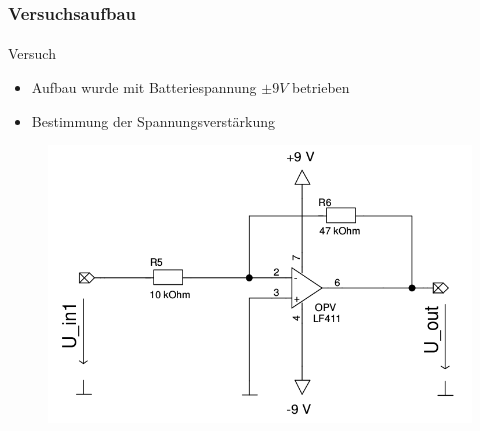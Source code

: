 \begin{frame}
\frametitle{Versuchsaufbau}
\framesubtitle{}
    \begin{block}{Versuch}
        \begin{itemize}
            \item Aufbau wurde mit Batteriespannung $\pm 9V$ betrieben
            \item Bestimmung der Spannungsverstärkung
        \end{itemize}    
    \end{block}    
    \begin{figure}[H]
    \begin{center}
            \includegraphics[scale=0.2]{./img/schaltung/inv_verst_0.png}
    \end{center}
    \end{figure}
\end{frame}

